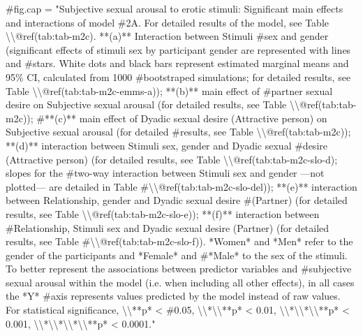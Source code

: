 \documentclass[
  bookmarksnumbered]{article}
\newenvironment{Shaded}{\begin{snugshade}}{\end{snugshade}}
\newcommand{\CommentTok}[1]{\textcolor[rgb]{0.50,0.62,0.50}{#1}}
\begin{document}
\begin{Shaded}
\begin{Highlighting}[]
\CommentTok{\#fig.cap = "Subjective sexual arousal to erotic stimuli: Significant main effects and interactions of model \#2A. For detailed results of the model, see Table \textbackslash{}\textbackslash{}@ref(tab:tab{-}m2c). **(a)** Interaction between Stimuli \#sex and gender (significant effects of stimuli sex by participant gender are represented with lines and \#stars. White dots and black bars represent estimated marginal means and 95\% CI, calculated from 1000 \#bootstraped simulations; for detailed results, see Table \textbackslash{}\textbackslash{}@ref(tab:tab{-}m2c{-}emms{-}a)); **(b)** main effect of \#partner sexual desire on Subjective sexual arousal (for detailed results, see Table \textbackslash{}\textbackslash{}@ref(tab:tab{-}m2c)); \#**(c)** main effect of Dyadic sexual desire (Attractive person) on Subjective sexual arousal  (for detailed \#results, see Table \textbackslash{}\textbackslash{}@ref(tab:tab{-}m2c)); **(d)** interaction between Stimuli sex, gender and Dyadic sexual \#desire (Attractive person) (for detailed results, see Table \textbackslash{}\textbackslash{}@ref(tab:tab{-}m2c{-}slo{-}d); slopes for the \#two{-}way interaction between Stimuli sex and gender —not plotted— are detailed in Table \#\textbackslash{}\textbackslash{}@ref(tab:tab{-}m2c{-}slo{-}del)); **(e)** interaction between Relationship, gender and Dyadic sexual desire \#(Partner) (for detailed results, see Table \textbackslash{}\textbackslash{}@ref(tab:tab{-}m2c{-}slo{-}e)); **(f)** interaction between \#Relationship, Stimuli sex and Dyadic sexual desire (Partner) (for detailed results, see Table \#\textbackslash{}\textbackslash{}@ref(tab:tab{-}m2c{-}slo{-}f)). *Women* and *Men* refer to the gender of the participants and *Female* and \#*Male* to the sex of the stimuli. To better represent the associations between predictor variables and \#subjective sexual arousal within the model (i.e. when including all other effects), in all cases the *Y* \#axis represents values predicted by the model instead of raw values. For statistical significance, \textbackslash{}\textbackslash{}**p* \textless{} \#0.05, \textbackslash{}\textbackslash{}*\textbackslash{}\textbackslash{}**p* \textless{} 0.01, \textbackslash{}\textbackslash{}*\textbackslash{}\textbackslash{}*\textbackslash{}\textbackslash{}**p* \textless{} 0.001, \textbackslash{}\textbackslash{}*\textbackslash{}\textbackslash{}*\textbackslash{}\textbackslash{}*\textbackslash{}\textbackslash{}**p* \textless{} 0.0001."}



\end{Highlighting}
\end{Shaded}
\end{document}
